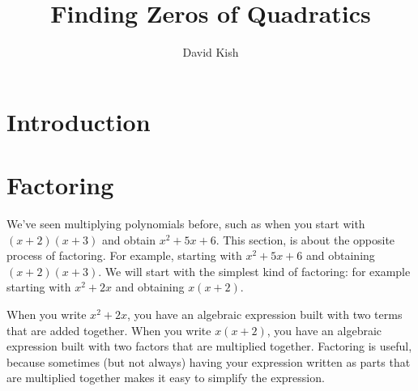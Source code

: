 \documentclass{ximera}
\author{David Kish}
\title{Finding Zeros of Quadratics}
\begin{document}
\begin{abstract}
  
\end{abstract}
\maketitle





\section{Introduction}



\section{Factoring}

 We've seen multiplying polynomials before,
      such as when you start with
      $(x+2)(x+3)$ and obtain $x^2+5x+6$.
     This section,  is about the opposite process of factoring.
      For example, starting with
      $x^2+5x+6$ and obtaining $(x+2)(x+3)$.
      We will start with the simplest kind of factoring:
      for example starting with $x^2+2x$ and obtaining $x(x+2)$.

      When you write $x^2+2x$,
      you have an algebraic expression built with two terms that are
      added together.
      When you write $x(x+2)$,
      you have an algebraic expression built with two factors that are
      multiplied together.
      Factoring is useful, because sometimes
      (but not always)
      having your expression written as parts that are multiplied
      together makes it easy to simplify the expression.
\end{document}
